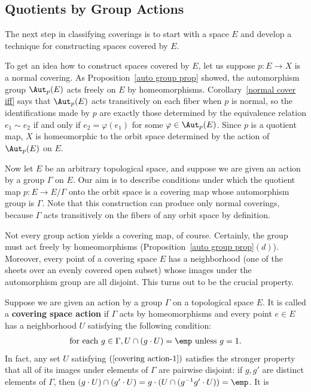\subsection{Quotients by Group Actions}
The next step in classifying coverings is to start with a space $E$ and develop a technique for constructing spaces covered by $E$.\par
To get an idea how to construct spaces covered by $E$, let us suppose $p:E\to X$ is a normal covering. As Proposition~\ref{auto group prop} showed, the automorphism group $\Aut_p(E)$ acts freely on $E$ by homeomorphisms. Corollary~\ref{normal cover iff} says that $\Aut_p(E)$ acts transitively on each fiber when $p$ is normal, so the identifications made by $p$ are exactly those determined by the equivalence relation $e_1\sim e_2$ if and only if $e_2=\varphi(e_1)$ for some $\varphi\in\Aut_p(E)$. Since $p$ is a quotient map, $X$ is homeomorphic to the orbit space determined by the action of $\Aut_p(E)$ on $E$.\par
Now let $E$ be an arbitrary topological space, and suppose we are given an action by a group $\Gamma$ on $E$. Our aim is to describe conditions under which the quotient map $p:E\to E/\Gamma$ onto the orbit space is a covering map whose automorphism group is $\Gamma$. Note that this construction can produce only normal coverings, because $\Gamma$ acts transitively on
the fibers of any orbit space by definition.\par
Not every group action yields a covering map, of course. Certainly, the group must act freely by homeomorphisms (Proposition~\ref{auto group prop}$(d)$). Moreover, every point of a covering space $E$ has a neighborhood (one of the sheets over an evenly covered open subset) whose images under the automorphism group are all disjoint. This turns out to be the crucial property.\par
Suppose we are given an action by a group $\Gamma$ on a topological space $E$. It is called a \textbf{covering space action} if $\Gamma$ acts by homeomorphisms and every point $e\in E$ has a neighborhood $U$ satisfying the following condition:
\begin{align}\label{covering action-1}
\text{for each }g\in\Gamma, U\cap(g\cdot U)=\emp\text{ unless }g=1.
\end{align}
In fact, any set $U$ satisfying $(\ref{covering action-1})$ satisfies the 
stronger property that all of its images under elements of $\Gamma$ are 
pairwise disjoint: if $g,g'$ are distinct elements of $\Gamma$, then 
$(g\cdot U)\cap(g'\cdot U)=g\cdot(U\cap(g^{-1}g'\cdot U))=\emp$. It is 
